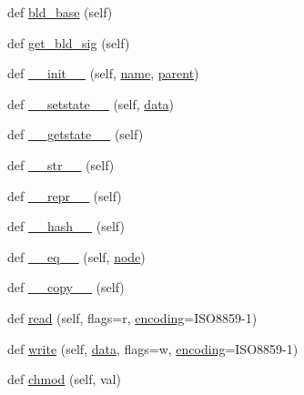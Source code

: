 \begin{DoxyCompactItemize}
def \hyperlink{classwaflib_1_1_node_1_1_node_a56b26245067bfe835f32199e74135a8a}{bld\+\_\+base} (self)
\item 
def \hyperlink{classwaflib_1_1_node_1_1_node_a804270edff72f7bc520841fa60a494e4}{get\+\_\+bld\+\_\+sig} (self)
\item 
def \hyperlink{classwaflib_1_1_node_1_1_node_acf6238a6107f9c667ddd3aee5b30c626}{\+\_\+\+\_\+init\+\_\+\+\_\+} (self, \hyperlink{lib_2expat_8h_a1b49b495b59f9e73205b69ad1a2965b0}{name}, \hyperlink{classwaflib_1_1_node_1_1_node_a2136fddf4c5e98dc8d1661bee03e725c}{parent})
\item 
def \hyperlink{classwaflib_1_1_node_1_1_node_ae1ce2af534851b1b56bc257f486be757}{\+\_\+\+\_\+setstate\+\_\+\+\_\+} (self, \hyperlink{lib_2expat_8h_ac39e72a1de1cb50dbdc54b08d0432a24}{data})
\item 
def \hyperlink{classwaflib_1_1_node_1_1_node_a5f7b73ba50d8a67499518eacf1946689}{\+\_\+\+\_\+getstate\+\_\+\+\_\+} (self)
\item 
def \hyperlink{classwaflib_1_1_node_1_1_node_aea11f410459c73450de99bd614222100}{\+\_\+\+\_\+str\+\_\+\+\_\+} (self)
\item 
def \hyperlink{classwaflib_1_1_node_1_1_node_a312e0f3ae404d593e43dc8afd8965de9}{\+\_\+\+\_\+repr\+\_\+\+\_\+} (self)
\item 
def \hyperlink{classwaflib_1_1_node_1_1_node_ad2272ed88f10bb1e6e2f473ec38fa5a4}{\+\_\+\+\_\+hash\+\_\+\+\_\+} (self)
\item 
def \hyperlink{classwaflib_1_1_node_1_1_node_a2fce3a217e2e7ef6192cb2e5e0671a4c}{\+\_\+\+\_\+eq\+\_\+\+\_\+} (self, \hyperlink{structnode}{node})
\item 
def \hyperlink{classwaflib_1_1_node_1_1_node_ac6b216662a82357074bf7508a313ac06}{\+\_\+\+\_\+copy\+\_\+\+\_\+} (self)
\item 
def \hyperlink{classwaflib_1_1_node_1_1_node_a05c37e221931a32e74bd11e2dbb38431}{read} (self, flags=\textquotesingle{}r\textquotesingle{}, \hyperlink{structencoding}{encoding}=\textquotesingle{}I\+S\+O8859-\/1\textquotesingle{})
\item 
def \hyperlink{classwaflib_1_1_node_1_1_node_a3e2f255b6614d98ff3f73903cc1a0439}{write} (self, \hyperlink{lib_2expat_8h_ac39e72a1de1cb50dbdc54b08d0432a24}{data}, flags=\textquotesingle{}w\textquotesingle{}, \hyperlink{structencoding}{encoding}=\textquotesingle{}I\+S\+O8859-\/1\textquotesingle{})
\item 
def \hyperlink{classwaflib_1_1_node_1_1_node_a7c69c9ee890bc2113f4f44c8b6d0aed5}{chmod} (self, val)
\item 

\end{DoxyCompactItemize}
